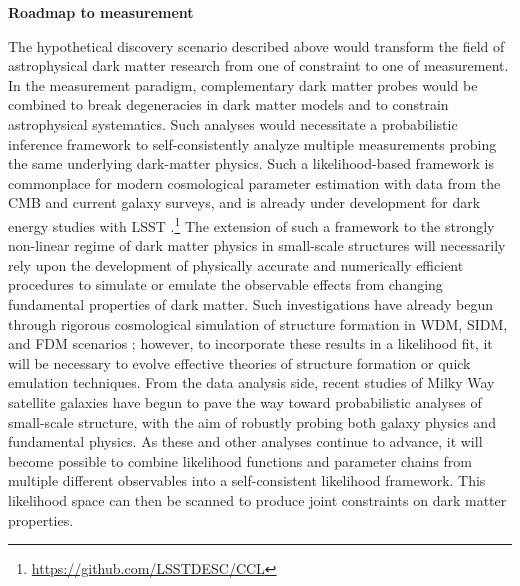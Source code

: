 

{\bf Roadmap to measurement}

The hypothetical discovery scenario described above would transform the field of astrophysical dark matter research from one of constraint to one of measurement.
In the measurement paradigm, complementary dark matter probes would be combined to break degeneracies in dark matter models and to constrain astrophysical systematics.
Such analyses would necessitate a probabilistic inference framework to self-consistently analyze multiple measurements probing the same underlying dark-matter physics. 
Such a likelihood-based framework is commonplace for modern cosmological parameter estimation with data from the CMB and current galaxy surveys, and is already under development for dark energy studies with LSST \citep{DESC:CCL}.\footnote{\url{https://github.com/LSSTDESC/CCL}} 
The extension of such a framework to the strongly non-linear regime of dark matter physics in small-scale structures will necessarily rely upon the development of physically accurate and numerically efficient procedures to simulate or emulate the observable effects from changing fundamental properties of dark matter.
Such investigations have already begun through rigorous cosmological simulation of structure formation in WDM, SIDM, and FDM scenarios \citep[\eg,][]{Lovell:2013ola,Dooley:2016ajo,1807.06018,1811.11791}; however, to incorporate these results in a likelihood fit, it will be necessary to evolve effective theories of structure formation \citep[\eg,][]{Cyr-Racine:2015ihg} or quick emulation techniques.
From the data analysis side, recent studies of Milky Way satellite galaxies \citep[\eg,][]{Jethwa:2018,Nadler:2018} have begun to pave the way toward probabilistic analyses of small-scale structure, with the aim of robustly probing both galaxy physics and fundamental physics.
As these and other analyses continue to advance, it will become possible to combine likelihood functions and parameter chains from multiple different observables into a self-consistent likelihood framework. 
This likelihood space can then be scanned to produce joint constraints on dark matter properties.

